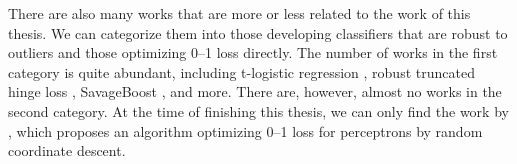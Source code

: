 There are also many works that are more or less related to the work of this thesis. We can categorize them into those developing classifiers that are robust to outliers and those optimizing 0--1 loss directly. The number of works in the first category is quite abundant, including t-logistic regression \cite{Ding}, robust truncated hinge loss \cite{robusthinge}, SavageBoost \cite{lossdesign}, and more. There are, however, almost no works in the second category. At the time of finishing this thesis, we can only find the work by \cite{ling}, which proposes an algorithm optimizing 0--1 loss for perceptrons by random coordinate descent. 
